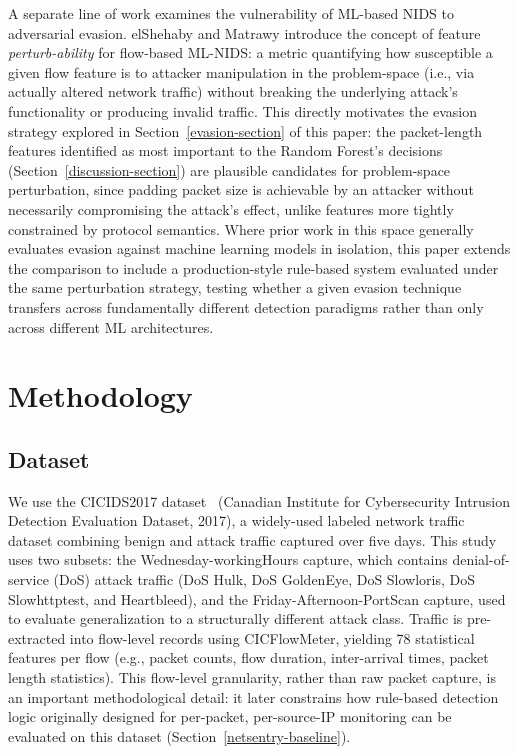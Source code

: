 \documentclass[conference]{IEEEtran}
\begin{document}
A separate line of work examines the vulnerability of ML-based NIDS to adversarial evasion. elShehaby and Matrawy \cite{elshehaby2024perturbability} introduce the concept of feature \emph{perturb-ability} for flow-based ML-NIDS: a metric quantifying how susceptible a given flow feature is to attacker manipulation in the problem-space (i.e., via actually altered network traffic) without breaking the underlying attack's functionality or producing invalid traffic. This directly motivates the evasion strategy explored in Section~\ref{evasion-section} of this paper: the packet-length features identified as most important to the Random Forest's decisions (Section~\ref{discussion-section}) are plausible candidates for problem-space perturbation, since padding packet size is achievable by an attacker without necessarily compromising the attack's effect, unlike features more tightly constrained by protocol semantics. Where prior work in this space generally evaluates evasion against machine learning models in isolation, this paper extends the comparison to include a production-style rule-based system evaluated under the same perturbation strategy, testing whether a given evasion technique transfers across fundamentally different detection paradigms rather than only across different ML architectures.
 
\section{Methodology}
 
\subsection{Dataset}
We use the CICIDS2017 dataset~\cite{sharafaldin2018cicids} (Canadian Institute for Cybersecurity Intrusion Detection Evaluation Dataset, 2017), a widely-used labeled network traffic dataset combining benign and attack traffic captured over five days. This study uses two subsets: the Wednesday-workingHours capture, which contains denial-of-service (DoS) attack traffic (DoS Hulk, DoS GoldenEye, DoS Slowloris, DoS Slowhttptest, and Heartbleed), and the Friday-Afternoon-PortScan capture, used to evaluate generalization to a structurally different attack class. Traffic is pre-extracted into flow-level records using CICFlowMeter, yielding 78 statistical features per flow (e.g., packet counts, flow duration, inter-arrival times, packet length statistics). This flow-level granularity, rather than raw packet capture, is an important methodological detail: it later constrains how rule-based detection logic originally designed for per-packet, per-source-IP monitoring can be evaluated on this dataset (Section~\ref{netsentry-baseline}).
 
\end{document}
